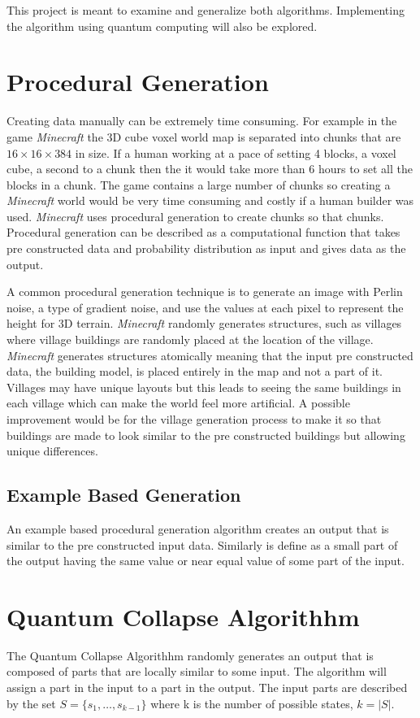 \documentclass{article}
\begin{document}
This project is meant to examine and generalize both algorithms. Implementing the algorithm using quantum computing will also be explored.

\section{Procedural Generation}
Creating data manually can be extremely time consuming. For example in the game {\it Minecraft} the 3D cube voxel world map is separated into chunks
that are $16\times16\times384$ in size. If a human working at a pace of setting 4 blocks, a voxel cube, a second to a chunk then the it would take more than
6 hours to set all the blocks in a chunk. The game contains a large number of chunks so creating a {\it Minecraft} world would be very time consuming
and costly if a human builder was used. {\it Minecraft} uses procedural generation to create chunks so that chunks. Procedural generation can be described
as a computational function that takes pre constructed data and probability distribution as input and gives data as the output.

A common procedural generation technique is to generate an image with Perlin noise, a type of gradient noise, and use the values at each pixel
to represent the height for 3D terrain. {\it Minecraft} randomly generates structures, such as villages where village buildings are randomly placed
at the location of the village. {\it Minecraft} generates structures atomically meaning that the input pre constructed data, the building model, is placed
entirely in the map and not a part of it. Villages may have unique layouts but this leads to seeing the same buildings in each village which can
make the world feel more artificial. A possible improvement would be for the village generation process to make it so that buildings are made to look
similar to the pre constructed buildings but allowing unique differences.

\subsection{Example Based Generation}
An example based procedural generation algorithm creates an output that is similar to the pre constructed input data. Similarly is define as
a small part of the output having the same value or near equal value of some part of the input. 

\section{Quantum Collapse Algorithhm}
The Quantum Collapse Algorithhm randomly generates an output that is composed of parts that are locally similar to some input.
The algorithm will assign a part in the input to a part in the output. The input parts are described by the set $S = \{s_1, \dots, s_{k-1}\}$ where k is the number
of possible states, $k = |S|$.
\end{document}
